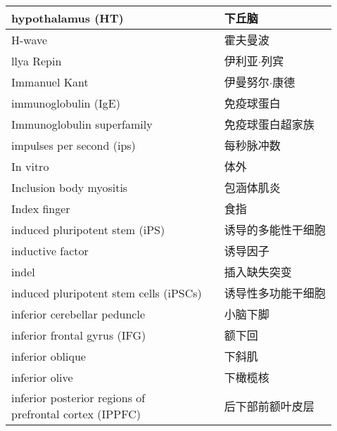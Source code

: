 \begin{longtable}{lll}
	\midrule
	hypothalamus (HT)     &&  下丘脑  \\
	
	\midrule
	H-wave     &&  霍夫曼波  \\
	
	\midrule
	llya Repin   && 伊利亚$\cdot$列宾  \\
	
	\midrule
	Immanuel Kant   && 伊曼努尔$\cdot$康德  \\
	
	\midrule
	immunoglobulin (IgE)   && 免疫球蛋白  \\
	
	\midrule
	Immunoglobulin superfamily   && 免疫球蛋白超家族  \\
	
	\midrule
	impulses per second (ips)   && 每秒脉冲数  \\
	
	\midrule
	In vitro   && 体外  \\
	
	\midrule
	Inclusion body myositis  && 包涵体肌炎  \\
	
	\midrule
	Index finger  && 食指  \\
	
	\midrule
	induced pluripotent stem (iPS)  && 诱导的多能性干细胞  \\
	
	\midrule
	inductive factor  && 诱导因子  \\
	
	\midrule
	indel   && 插入缺失突变  \\
	
	\midrule
	induced pluripotent stem cells (iPSCs)  && 诱导性多功能干细胞  \\
	
	\midrule \label{term:inferior_cerebellar_peduncel}
	inferior cerebellar peduncle   && 小脑下脚  \\
	
	\midrule
	inferior frontal gyrus (IFG)   && 额下回  \\
	
	\midrule
	inferior oblique   && 下斜肌  \\
	
	\midrule
	inferior olive   && 下橄榄核  \\
	
	\midrule
	\makecell[l]{inferior posterior regions of \\ prefrontal cortex (IPPFC)}  && 后下部前额叶皮层  \\
	

\end{longtable}
